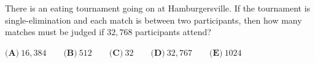 There is an eating tournament going on at Hamburgersville. If the tournament is single-elimination and each match is between two participants, then how many matches must be judged if $32,768$ participants attend?

$\textbf{(A)}~16,384\qquad\textbf{(B)}~512\qquad\textbf{(C)}~32\qquad\textbf{(D)}~32,767\qquad\textbf{(E)}~1024\qquad$
